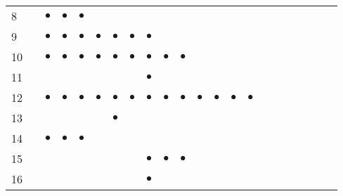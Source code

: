\documentclass[text.tex]{subfiles}
\begin{document}
{\begin{center}
\begin{longtable}{l|ccccccccccccccccccccc}
8   &           & $\bullet$ & $\bullet$ & $\bullet$ &           &           &           &           &           &           &           &           &           &           &           &           &           &           &           &           &           \\
9   &           & $\bullet$ & $\bullet$ & $\bullet$ & $\bullet$ & $\bullet$ & $\bullet$ & $\bullet$ &           &           &           &           &           &           &           &           &           &           &           &           &           \\
10  &           & $\bullet$ & $\bullet$ & $\bullet$ & $\bullet$ & $\bullet$ & $\bullet$ & $\bullet$ & $\bullet$ & $\bullet$ &           &           &           &           &           &           &           &           &           &           &           \\
11  &           &           &           &           &           &           &           & $\bullet$ &           &           &           &           &           &           &           &           &           &           &           &           &           \\
12  &           & $\bullet$ & $\bullet$ & $\bullet$ & $\bullet$ & $\bullet$ & $\bullet$ & $\bullet$ & $\bullet$ & $\bullet$ & $\bullet$ & $\bullet$ & $\bullet$ & $\bullet$ &           &           &           &           &           &           &           \\
13  &           &           &           &           &           & $\bullet$ &           &           &           &           &           &           &           &           &           &           &           &           &           &           &           \\
14  &           & $\bullet$ & $\bullet$ & $\bullet$ &           &           &           &           &           &           &           &           &           &           &           &           &           &           &           &           &           \\
15  &           &           &           &           &           &           &           & $\bullet$ & $\bullet$ & $\bullet$ &           &           &           &           &           &           &           &           &           &           &           \\
16  &           &           &           &           &           &           &           & $\bullet$ &           &           &           &           &           &           &           &           &           &           &           &           &           \\

\end{longtable}
\end{center}}
\end{document}
